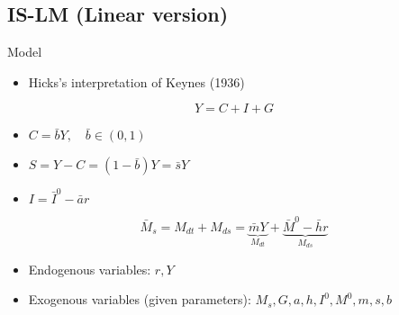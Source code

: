 \documentclass[a4paper,11pt]{article}
\begin{document}
\subsection{IS-LM (Linear version)} %
\label{sub:is_lm_linear_version}
\begin{frame}[t]{Model}
	\begin{itemize}
		\item Hicks's interpretation of Keynes (1936)
	\end{itemize}
	\[
		Y=C+I+G \tag{IS Schedule: Real side}
	\]
	\begin{itemize}
		\item $C=\bar b Y, \quad \bar b \in (0,1)$
		\item $S=Y-C=(1-\bar b ) Y=\bar s Y$
		\item $I=\bar I^0-\bar a r$
	\end{itemize}
	\[
		\bar M_s = M_{dt}+M_{ds} = \underbrace{\bar m Y}_{M_{dt}} + \underbrace{\bar M^0 - \bar h r}_{M_{ds}} \tag{LM Schedule: Monetary side}
	\]
	\begin{itemize}
		\item Endogenous variables: $r,Y$
		\item Exogenous variables (given parameters): $M_s, G, a, h, I^0, M^0, m, s, b$
	\end{itemize}
\end{frame}
	
\end{document}
